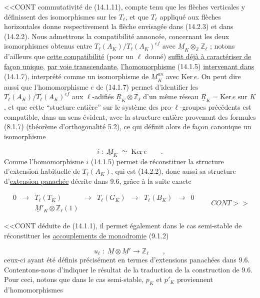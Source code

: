 <<CONT commutativité de (14.1.11), compte tenu que les flèches verticales y définissent des isomorphismes sur les $T_\ell$, et que $T_\ell$ appliqué aux flèches horizontales donne respectivement la flèche envisagée dans (14.2.3) et dans (14.2.2). Nous admettrons la compatibilité annoncée, concernant les deux isomorphismes obtenus entre $T_\ell(A_K)/T_\ell(A_K)^{ef}$ avec $\underline{M}_K \otimes_{\mathbb{Z}} \mathbb{Z}_\ell$ ; notons d'ailleurs que \underline{cette compatibilité} (pour un $\ell$ donné) \underline{suffit déjà à caractériser de façon unique}, \underline{par voie transcendante}, \underline{l'homomorphisme} (14.1.5) \underline{intervenant dans} (14.1.7), interprété comme un isomorphisme de $\underline{M}_K^{an}$ avec $\mathrm{Ker}\, e$. On peut dire aussi que l'homomorphisme $e$ de (14.1.7) permet d'identifier les $T_\ell(A_K)/T_\ell(A_K)^{ef}$ aux $\ell$-adifiés $\underline{R}_K \otimes \mathbb{Z}_\ell$ d'un même réseau $\underline{R}_K = \mathrm{Ker}\, e$ sur $K$, et que cette ``stucture entière'' sur le système des pro-$\ell$-groupes précédents est compatible, dans un sens évident, avec la structure entière provenant des formules (8.1.7) (théorème d'orthogonalité 5.2), ce qui définit alors de façon canonique un isomorphisme

\begin{equation*}
i \;:\; \underline{M}_K \;\simeq\; \mathrm{Ker}\, e \qquad .
\end{equation*}
Comme l'homomorphisme $i$ (14.1.5) permet de réconstituer la structure d'extension habituelle de $T_\ell(A_K)$, qui est (14.2.2), donc aussi sa structure d'\underline{extension panachée} décrite dans 9.6, grâce à la suite exacte

\begin{equation*}
\begin{array}{ccccccccc}
0 & \longrightarrow & T_\ell(T_K) & \longrightarrow & T_\ell(G_K) & \longrightarrow & T_\ell(B_K) & \longrightarrow & 0 \\[5ex]
 & & \underline{M}'_K \otimes \mathbb{Z}_\ell(1) & & & & & &
\end{array} \qquad CONT>>
\end{equation*}


<<CONT déduite de (14.1.1), il permet également dans le cas semi-stable de réconstituer les \underline{accouplements de monodromie} (9.1.2)

\begin{equation}\tag{14.2.4}
u_\ell \;:\; \underline{M} \otimes \underline{M}' \longrightarrow \mathbb{Z}_\ell \qquad ,
\end{equation}
ceux-ci ayant été définis précisément en termes d'extensions panachées dans 9.6. Contentons-nous d'indiquer le résultat de la traduction de la construction de 9.6. Pour ceci, notons que dans le cas semi-stable, $p_K$ et $p'_K$ proviennent d'homomorphismes

